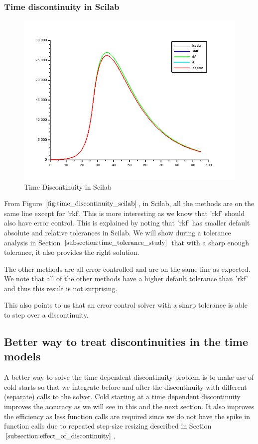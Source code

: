 \subsubsection{Time discontinuity in Scilab}
\begin{figure}[h]
	\centering
	\includegraphics[width=0.7\linewidth]{./figures/time_discontinuity_scilab}
	\caption{Time Discontinuity in Scilab}
	\label{fig:time_discontinuity_scilab}
\end{figure}
From Figure $\ref{fig:time_discontinuity_scilab}$, in Scilab, all the methods are on the same line except for 'rkf'. This is more interesting as we know that 'rkf' should also have error control. This is explained by noting that 'rkf' has smaller default absolute and relative tolerances in Scilab. We will show during a tolerance analysis in Section $\ref{subsection:time_tolerance_study}$ that with a sharp enough tolerance, it also provides the right solution.

The other methods are all error-controlled and are on the same line as expected. We note that all of the other methods have a higher default tolerance than 'rkf' and thus this result is not surprising.

This also points to us that an error control solver with a sharp tolerance is able to step over a discontinuity.
  

\subsection{Better way to treat discontinuities in the time models}
\label{subsection:time_disc_handling}
A better way to solve the time dependent discontinuity problem is to make use of cold starts so that we integrate before and after the discontinuity with different (separate) calls to the solver. Cold starting at a time dependent discontinuity improves the accuracy as we will see in this and the next section. It also improves the efficiency as less function calls are required since we do not have the spike in function calls due to repeated step-size resizing described in Section $\ref{subsection:effect_of_discontinuity}$.

